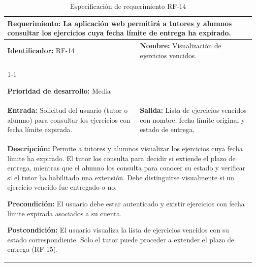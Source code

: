 \begin{longtable}{|p{7cm}|p{8cm}|}
\caption{Especificación de requerimiento RF-14}
\label{tab:rf14} \\ \hline

\multicolumn{2}{|p{15cm}|}{\textbf{Requerimiento:} La aplicación web permitirá a tutores y alumnos consultar los ejercicios cuya fecha límite de entrega ha expirado.} \\ \hline

\textbf{Identificador:} RF-14 &
\textbf{Nombre:} Visualización de ejercicios vencidos. \\ \cline{1-1}

\textbf{Prioridad de desarrollo:} Media &
\multicolumn{1}{p{8cm}|}{} \\ \hline

\textbf{Entrada:} Solicitud del usuario (tutor o alumno) para consultar los ejercicios con fecha límite expirada. &
\textbf{Salida:} Lista de ejercicios vencidos con nombre, fecha límite original y estado de entrega. \\ \hline

\multicolumn{2}{|p{15cm}|}{
\textbf{Descripción:} Permite a tutores y alumnos visualizar los ejercicios cuya fecha límite ha expirado. El tutor los consulta para decidir si extiende el plazo de entrega, mientras que el alumno los consulta para conocer su estado y verificar si el tutor ha habilitado una extensión. Debe distinguirse visualmente si un ejercicio vencido fue entregado o no.

\vspace{0.2cm}
\textbf{Precondición:} El usuario debe estar autenticado y existir ejercicios con fecha límite expirada asociados a su cuenta.

\vspace{0.2cm}
\textbf{Postcondición:} El usuario visualiza la lista de ejercicios vencidos con su estado correspondiente. Solo el tutor puede proceder a extender el plazo de entrega (RF-15).
} \\ \hline

\end{longtable}

